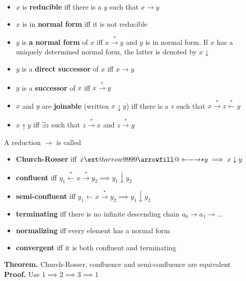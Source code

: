 \documentclass[titlepage, 12pt]{article}
\makeatletter
\newcommand\xleftrightarrow[2][]{%
\ext@arrow 9999{\longleftrightarrowfill@}{#1}{#2}}
\newcommand\longleftrightarrowfill@{%
\arrowfill@\leftarrow\relbar\rightarrow}
\makeatother
\begin{document}
\begin{itemize}

  \item $x$ is \textbf{reducible} iff there is a $y$ such that $x\rightarrow y$

  \item $x$ is in \textbf{normal form} iff it is not reducible

  \item $y$ is \textbf{a normal form} of $x$ iff $x\xrightarrow{*}y$ and $y$ is
    in normal form. If $x$ has a uniquely determined normal form, the latter is
    denoted by $x\downarrow$

  \item $y$ is a \textbf{direct successor} of $x$ iff $x\rightarrow y$

  \item $y$ is a \textbf{successor} of $x$ iff $x\xrightarrow{+}y$

  \item $x$ and $y$ are \textbf{joinable} (written $x\downarrow y$) iff there is a $z$ such that
    $x\xrightarrow{*}z\xleftarrow{*}y$

\item $x\uparrow y$ iff $\exists z$ such that $z\xrightarrow{*} x$ and
    $z\xrightarrow{*} y$

\end{itemize}

A reduction $\rightarrow$ is called

\begin{itemize}

  \item\textbf{Church-Rosser} iff $x\xleftrightarrow{*}y\implies x\downarrow y$

  \item\textbf{confluent} iff $y_1\xleftarrow{*} x\xrightarrow{*}
      y_2\implies y_1\downarrow y_2$

  \item\textbf{semi-confluent} iff $y_1\leftarrow x\xrightarrow{*}y_2\implies
    y_1\downarrow y_2$

  \item\textbf{terminating} iff there is no infinite descending chain
    $a_0\rightarrow a_1\rightarrow\dots$

  \item\textbf{normalizing} iff every element has a normal form

  \item\textbf{convergent} iff it is both confluent and terminating

\end{itemize}
\textbf{Theorem.} Church-Rosser, confluence and semi-confluence are equivalent\\
\textbf{Proof.} Use $1 \implies 2 \implies 3 \implies 1$
\end{document}
